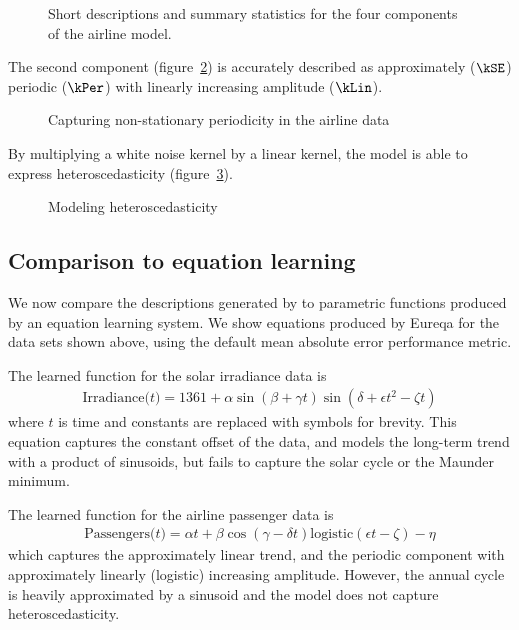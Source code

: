 \begin{figure}[h]
\centering
{}
\caption{
Short descriptions and summary statistics for the four components of the airline model.}
\label{fig:exec-airline}
\end{figure}

The second component (figure~\ref{fig:lin_periodic}) is accurately described as approximately ($\kSE$) periodic ($\kPer$) with linearly increasing amplitude ($\kLin$).
%
\begin{figure}[h]
\centering
{}
\caption{Capturing non-stationary periodicity in the airline data}
\label{fig:lin_periodic}
\end{figure}
%
By multiplying a white noise kernel by a linear kernel, the model is able to express heteroscedasticity (figure~\ref{fig:heteroscedastic}).
%
\begin{figure}[h]
\centering
{}
\caption{Modeling heteroscedasticity}
\label{fig:heteroscedastic}
\end{figure}

\subsection{Comparison to equation learning}
\label{sec:eqn-learning-comp}

We now compare the descriptions generated by \procedurename{} to parametric functions produced by an equation learning system.
We show equations produced by Eureqa \citep{Eureqa} for the data sets shown above, using the default mean absolute error performance metric.

The learned function for the solar irradiance data is
\begin{align*}
\textrm{Irradiance($t$)} = 1361 + \alpha\sin(\beta + \gamma t)\sin(\delta + \epsilon t^2 - \zeta t)
\end{align*}
where $t$ is time and constants are replaced with symbols for brevity.
This equation captures the constant offset of the data, and models the long-term trend with a product of sinusoids, but fails to capture the solar cycle or the Maunder minimum.

The learned function for the airline passenger data is
\begin{align*}
\textrm{Passengers($t$)} = \alpha t + \beta\cos(\gamma - \delta t)\textrm{logistic}(\epsilon t - \zeta) - \eta
\end{align*}
which captures the approximately linear trend, and the periodic component with approximately linearly (logistic) increasing amplitude.
However, the annual cycle is heavily approximated by a sinusoid and the model does not capture heteroscedasticity.

